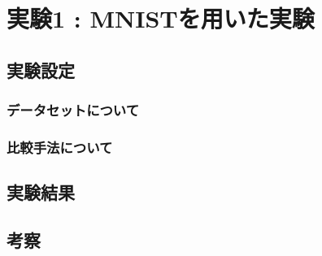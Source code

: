 \chapter{実験1 : MNISTを用いた実験}
\section{実験設定}
\subsection{データセットについて}
\subsection{比較手法について}
\section{実験結果}
\section{考察}
